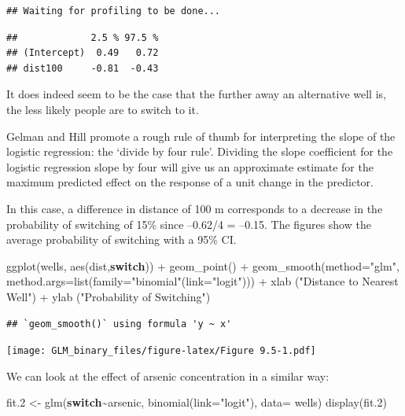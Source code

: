 \documentclass[
]{article}
\newenvironment{Shaded}{\begin{snugshade}}{\end{snugshade}}
\newcommand{\AttributeTok}[1]{\textcolor[rgb]{0.77,0.63,0.00}{#1}}
\newcommand{\ControlFlowTok}[1]{\textcolor[rgb]{0.13,0.29,0.53}{\textbf{#1}}}
\newcommand{\FloatTok}[1]{\textcolor[rgb]{0.00,0.00,0.81}{#1}}
\newcommand{\FunctionTok}[1]{\textcolor[rgb]{0.00,0.00,0.00}{#1}}
\newcommand{\NormalTok}[1]{#1}
\newcommand{\OtherTok}[1]{\textcolor[rgb]{0.56,0.35,0.01}{#1}}
\newcommand{\SpecialCharTok}[1]{\textcolor[rgb]{0.00,0.00,0.00}{#1}}
\newcommand{\StringTok}[1]{\textcolor[rgb]{0.31,0.60,0.02}{#1}}
\begin{document}
\begin{verbatim}
## Waiting for profiling to be done...
\end{verbatim}

\begin{verbatim}
##             2.5 % 97.5 %
## (Intercept)  0.49   0.72
## dist100     -0.81  -0.43
\end{verbatim}

It does indeed seem to be the case that the further away an alternative
well is, the less likely people are to switch to it.

Gelman and Hill promote a rough rule of thumb for interpreting the slope
of the logistic regression: the `divide by four rule'. Dividing the
slope coefficient for the logistic regression slope by four will give us
an approximate estimate for the maximum predicted effect on the response
of a unit change in the predictor.

In this case, a difference in distance of 100 m corresponds to a
decrease in the probability of switching of 15\% since --0.62/4 =
--0.15. The figures show the average probability of switching with a
95\% CI.

\begin{Shaded}
\begin{Highlighting}[]
\FunctionTok{ggplot}\NormalTok{(wells, }\FunctionTok{aes}\NormalTok{(dist,}\ControlFlowTok{switch}\NormalTok{)) }\SpecialCharTok{+}
         \FunctionTok{geom\_point}\NormalTok{() }\SpecialCharTok{+}
         \FunctionTok{geom\_smooth}\NormalTok{(}\AttributeTok{method=}\StringTok{"glm"}\NormalTok{, }\AttributeTok{method.args=}\FunctionTok{list}\NormalTok{(}\AttributeTok{family=}\StringTok{"binomial"}\NormalTok{(}\AttributeTok{link=}\StringTok{"logit"}\NormalTok{))) }\SpecialCharTok{+} 
         \FunctionTok{xlab}\NormalTok{ (}\StringTok{"Distance to Nearest Well"}\NormalTok{) }\SpecialCharTok{+}
         \FunctionTok{ylab}\NormalTok{ (}\StringTok{"Probability of Switching"}\NormalTok{)}
\end{Highlighting}
\end{Shaded}

\begin{verbatim}
## `geom_smooth()` using formula 'y ~ x'
\end{verbatim}

\texttt{[image: GLM\_binary\_files/figure-latex/Figure 9.5-1.pdf]}

We can look at the effect of arsenic concentration in a similar way:

\begin{Shaded}
\begin{Highlighting}[]
\NormalTok{fit}\FloatTok{.2} \OtherTok{\textless{}{-}} \FunctionTok{glm}\NormalTok{(}\ControlFlowTok{switch}\SpecialCharTok{\textasciitilde{}}\NormalTok{arsenic, }\FunctionTok{binomial}\NormalTok{(}\AttributeTok{link=}\StringTok{"logit"}\NormalTok{), }\AttributeTok{data=}\NormalTok{ wells)}
\FunctionTok{display}\NormalTok{(fit}\FloatTok{.2}\NormalTok{)}
\end{Highlighting}
\end{Shaded}
\end{document}
